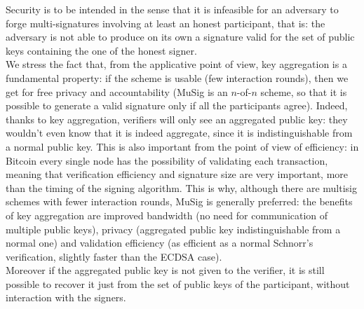 Security is to be intended in the sense that it is infeasible for an adversary to forge multi-signatures involving at least an honest participant, that is: the adversary is not able to produce on its own a signature valid for the set of public keys containing the one of the honest signer.
\\
We stress the fact that, from the applicative point of view, key aggregation is a fundamental property: if the scheme is usable (few interaction rounds), then we get for free privacy and accountability (MuSig is an $n$-of-$n$ scheme, so that it is possible to generate a valid signature only if all the participants agree). Indeed, thanks to key aggregation, verifiers will only see an aggregated public key: they wouldn't even know that it is indeed aggregate, since it is indistinguishable from a normal public key. This is also important from the point of view of efficiency: in Bitcoin every single node has the possibility of validating each transaction, meaning that verification efficiency and signature size are very important, more than the timing of the signing algorithm. This is why, although there are multisig schemes with fewer interaction rounds, MuSig is generally preferred: the benefits of key aggregation are improved bandwidth (no need for communication of multiple public keys), privacy (aggregated public key indistinguishable from a normal one) and validation efficiency (as efficient as a normal Schnorr's verification, slightly faster than the ECDSA case).
\\
Moreover if the aggregated public key is not given to the verifier, it is still possible to recover it just from the set of public keys of the participant, without interaction with the signers.

